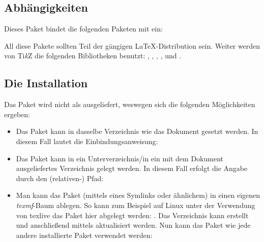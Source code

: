 \documentclass{sopra-base}
\begin{document}
\subsection{Abhängigkeiten}
    Dieses Paket bindet die folgenden Paketen mit ein:
    \begin{multicols}{3}
    \end{multicols}
    All diese Pakete sollten Teil der gängigen \LaTeX-Distribution sein. Weiter werden von Ti\textit{k}Z die folgenden
    Bibliotheken benutzt: , , , ,  und .

\subsection{Die Installation}
    Das Paket wird nicht als  ausgeliefert, weswegen sich die
    folgenden Möglichkeiten ergeben:
    \begin{itemize}
        \item Das Paket kann in dasselbe Verzeichnis wie das Dokument
                gesetzt werden. In diesem Fall lautet die Einbindungsanweisung:
\begin{plainlatex}
\usepackage{sopra-models}
\end{plainlatex}
        \item Das Paket kann in ein Unterverzeichnis/in ein mit
                dem Dokument ausgeliefertes Verzeichnis gelegt werden. In
                diesem Fall erfolgt die Angabe durch den (relativen-) Pfad:
\begin{plainlatex}
\usepackage{./Mein/Pfad/zu/sopra-models}
\end{plainlatex}
        \item Man kann das Paket (mittels eines Symlinks oder ähnlichem)
              in einen eigenen \emph{texmf}-Baum ablegen.
              So kann zum Beispiel auf Linux unter der Verwendung von texlive
              das Paket hier abgelegt werden: .
              Das Verzeichnis kann erstellt und anschließend mittels
               aktualisiert werden. Nun kann
              das Paket wie jede andere installierte Paket verwendet werden:
\begin{plainlatex}
\usepackage{sopra-models}
\end{plainlatex}
    \end{itemize}
\end{document}
